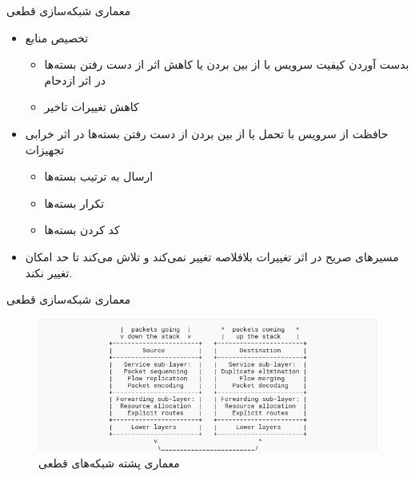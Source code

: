 \documentclass[dvipsnames]{beamer}
\makeatletter
\newcommand{\RTList}{\raggedleft\rightskip\@totalleftmargin}
\makeatother
\begin{document}
\begin{persian}
	\begin{frame}{معماری شبکه‌سازی قطعی}
		\begin{itemize}\RTList{}
			\justifying%
			\item تخصیص منابع
			\begin{itemize}\RTList{}
			  \item بدست آوردن کیفیت سرویس با از بین بردن یا کاهش اثر از دست رفتن بسته‌ها در اثر ازدحام
			  \item کاهش تغییرات تاخیر
			\end{itemize}
		  \item حافظت از سرویس با تحمل یا از بین بردن از دست رفتن بسته‌ها در اثر خرابی تجهیزات
		  \begin{itemize}\RTList{}
			\item ارسال به ترتیب بسته‌ها
			\item تکرار بسته‌ها
			\item کد کردن بسته‌ها
		  \end{itemize}
		  \item مسیرهای صریح در اثر تغییرات بلافلاصه تغییر نمی‌کند و تلاش می‌کند تا حد امکان تغییر نکند.
		\end{itemize}
	\end{frame}

	\begin{frame}{معماری شبکه‌سازی قطعی}
		\begin{center}\begin{figure}
			\includegraphics[scale=0.4]{images/detnet-stack.png}
			\caption{معماری پشته شبکه‌های قطعی}
		\end{figure}\end{center}
	\end{frame}


\end{persian}
\end{document}
